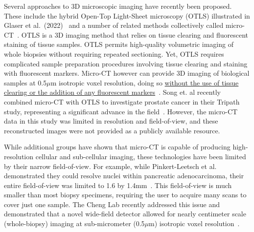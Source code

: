 \documentclass{NIHGrant}
\theoremstyle{theorem}
\begin{document}
Several approaches to 3D microscopic imaging have recently been proposed.
These include the hybrid Open-Top Light-Sheet microscopy (OTLS) illustrated in
Glaser et al.~(2022)~\cite{glaser_hybrid_2022} and a number of related methods collectively called
micro-CT~\cite{katsamenis_x-ray_2019,topperwien_contrast_2019,frost_3d_2023,song_analysis_2024,cheng_whole-animal_2011,ding_computational_2019}. OTLS is a 3D imaging method that relies on tissue clearing and fluorescent staining of tissue samples. OTLS permits high-quality
volumetric imaging of whole biopsies without requiring repeated sectioning.
Yet, OTLS requires complicated sample preparation procedures involving tissue clearing and staining with fluorescent markers. Micro-CT however can provide 3D imaging of biological samples at 0.5$\mu$m isotropic voxel resolution, doing so \uline{without the use of tissue clearing or the addition of any fluorescent markers}~\cite{pinkert-leetsch_three-dimensional_2023,yakovlev_wide-field_2022,ding_computational_2019,tajbakhsh_3d_2024,topperwien_correlative_2020}. Song et. al recently combined micro-CT with OTLS to investigate prostate cancer in their Tripath study, representing a significant advance in the field~\cite{song_analysis_2024}. However, the micro-CT data in this study was limited in resolution and field-of-view, and these reconstructed images were not provided as a publicly available resource.

While additional groups have shown that micro-CT is capable of producing
high-resolution cellular and sub-cellular imaging, these technologies have
been limited by their narrow field-of-view. For example, while Pinkert-Leetsch et al.
demonstrated they could resolve nuclei within pancreatic adenocarcinoma, their entire field-of-view was limited to 1.6 by 1.4mm~\cite{pinkert-leetsch_three-dimensional_2023}. This field-of-view is much smaller than most biopsy specimens, requiring the user to acquire many scans to cover just one sample. The Cheng Lab
recently addressed this issue and demonstrated that a novel wide-field
detector allowed for nearly centimeter scale (whole-biopsy) imaging at sub-micrometer (0.5$\mu$m) isotropic voxel
resolution~\cite{yakovlev_wide-field_2022}.
\end{document}
